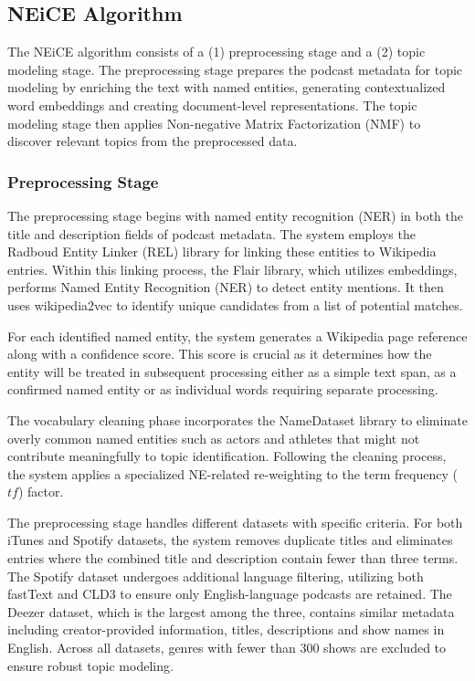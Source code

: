 \documentclass[manuscript]{acmart}
\begin{document}
\subsection{NEiCE Algorithm}

The NEiCE algorithm consists of a (1) preprocessing stage and a (2) topic modeling stage. The preprocessing stage prepares the podcast metadata for topic modeling by enriching the text with named entities, generating contextualized word embeddings and creating document-level representations. The topic modeling stage then applies Non-negative Matrix Factorization (NMF) to discover relevant topics from the preprocessed data.

\subsubsection{Preprocessing Stage}

The preprocessing stage begins with named entity recognition (NER) in both the title and description fields of podcast metadata. The system employs the Radboud Entity Linker (REL) library for linking these entities to Wikipedia entries. Within this linking process, the Flair library, which utilizes embeddings, performs Named Entity Recognition (NER) to detect entity mentions. It then uses wikipedia2vec to identify unique candidates from a list of potential matches.

For each identified named entity, the system generates a Wikipedia page reference along with a confidence score. This score is crucial as it determines how the entity will be treated in subsequent processing \textendash{} either as a simple text span, as a confirmed named entity or as individual words requiring separate processing.

The vocabulary cleaning phase incorporates the NameDataset library to eliminate overly common named entities such as actors and athletes that might not contribute meaningfully to topic identification. Following the cleaning process, the system applies a specialized NE-related re-weighting to the term frequency ($tf$) factor.

The preprocessing stage handles different datasets with specific criteria. For both iTunes and Spotify datasets, the system removes duplicate titles and eliminates entries where the combined title and description contain fewer than three terms. The Spotify dataset undergoes additional language filtering, utilizing both fastText and CLD3 to ensure only English-language podcasts are retained. The Deezer dataset, which is the largest among the three, contains similar metadata including creator-provided information, titles, descriptions and show names in English. Across all datasets, genres with fewer than 300 shows are excluded to ensure robust topic modeling.
\end{document}

